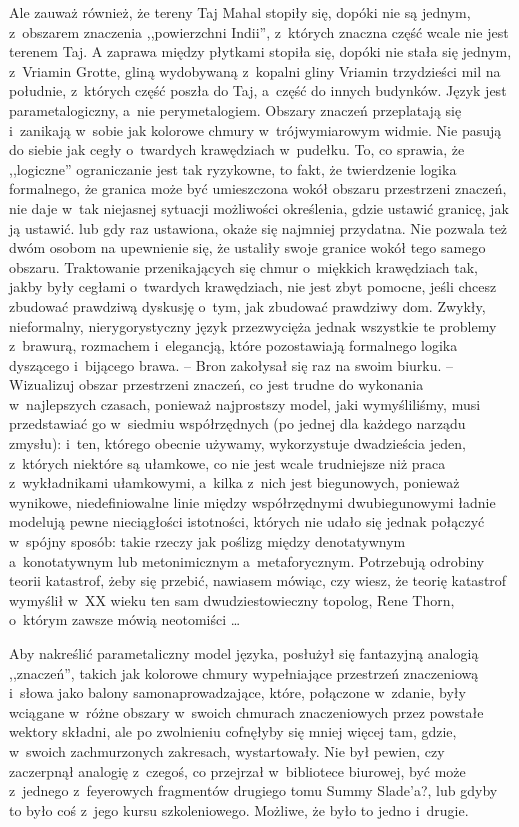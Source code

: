 \documentclass[oneside,polish,11pt,rmheadings]{mwbk}
\begin{document}
Ale zauważ również, że tereny Taj Mahal stopiły się, dopóki nie są jednym, z~obszarem znaczenia ,,powierzchni Indii'', z~których znaczna część wcale nie jest terenem Taj. A zaprawa między płytkami stopiła się, dopóki nie stała się jednym, z~Vriamin Grotte, gliną wydobywaną z~kopalni gliny Vriamin trzydzieści mil na południe, z~których część poszła do Taj, a~część do innych budynków. Język jest parametalogiczny, a~nie perymetalogiem. Obszary znaczeń przeplatają się i~zanikają w~sobie jak kolorowe chmury w~trójwymiarowym widmie. Nie pasują do siebie jak cegły o~twardych krawędziach w~pudełku. To, co sprawia, że ,,logiczne'' ograniczanie jest tak ryzykowne, to fakt, że twierdzenie logika formalnego, że granica może być umieszczona wokół obszaru przestrzeni znaczeń, nie daje w~tak niejasnej sytuacji możliwości określenia, gdzie ustawić granicę, jak ją ustawić. lub gdy raz ustawiona, okaże się najmniej przydatna. Nie pozwala też dwóm osobom na upewnienie się, że ustaliły swoje granice wokół tego samego obszaru. Traktowanie przenikających się chmur o~miękkich krawędziach tak, jakby były cegłami o~twardych krawędziach, nie jest zbyt pomocne, jeśli chcesz zbudować prawdziwą dyskusję o~tym, jak zbudować prawdziwy dom. Zwykły, nieformalny, nierygorystyczny język przezwycięża jednak wszystkie te problemy z~brawurą, rozmachem i~elegancją, które pozostawiają formalnego logika dyszącego i~bijącego brawa. -- Bron zakołysał się raz na swoim biurku. -- Wizualizuj obszar przestrzeni znaczeń, co jest trudne do wykonania w~najlepszych czasach, ponieważ najprostszy model, jaki wymyśliliśmy, musi przedstawiać go w~siedmiu współrzędnych (po jednej dla każdego narządu zmysłu): i~ten, którego obecnie używamy, wykorzystuje dwadzieścia jeden, z~których niektóre są ułamkowe, co nie jest wcale trudniejsze niż praca z~wykładnikami ułamkowymi, a~kilka z~nich jest biegunowych, ponieważ wynikowe, niedefiniowalne linie między współrzędnymi dwubiegunowymi ładnie modelują pewne nieciągłości istotności, których nie udało się jednak połączyć w~spójny sposób: takie rzeczy jak poślizg między denotatywnym a~konotatywnym lub metonimicznym a~metaforycznym. Potrzebują odrobiny teorii katastrof, żeby się przebić, nawiasem mówiąc, czy wiesz, że teorię katastrof wymyślił w~XX wieku ten sam dwudziestowieczny topolog, Rene Thorn, o~którym zawsze mówią neotomiści \ldots  

Aby nakreślić parametaliczny model języka, posłużył się fantazyjną analogią ,,znaczeń'', takich jak kolorowe chmury wypełniające przestrzeń znaczeniową i~słowa jako balony samonaprowadzające, które, połączone w~zdanie, były wciągane w~różne obszary w~swoich chmurach znaczeniowych przez powstałe wektory składni, ale po zwolnieniu cofnęłyby się mniej więcej tam, gdzie, w~swoich zachmurzonych zakresach, wystartowały. Nie był pewien, czy zaczerpnął analogię z~czegoś, co przejrzał w~bibliotece biurowej, być może z~jednego z~feyerowych fragmentów drugiego tomu Summy Slade'a?, lub gdyby to było coś z~jego kursu szkoleniowego. Możliwe, że było to jedno i~drugie. 
\end{document}
